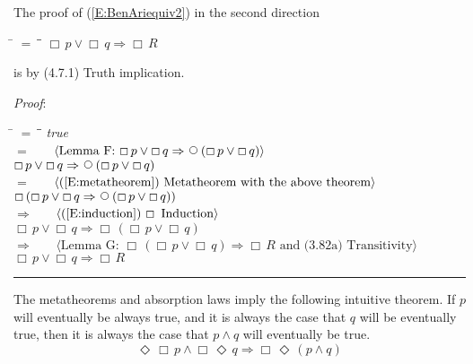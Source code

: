 \documentclass[12pt, fleqn, leqno]{article}
\newcommand{\lgap}{2pt}                             %
\newcommand{\mymathindent}{24pt}                    %
\newcommand{\impl}{\ensuremath{\Rightarrow}}        %
\newcommand{\Next}{\;\,\text{\raisebox{3.5pt}{\circle{6}}}}
\newcommand{\Event}{\Diamond\,}
\newcommand{\Always}{\Box\,}
\newcommand{\myqed}{\rule[-.23ex]{1.2ex}{2.0ex}}
\newcommand{\myqedtab}{\hspace{384pt}}              %
\newcommand{\Gll} {\langle}                         %
\newcommand{\Ggg} {\rangle}                         %
\newcommand{\Hint}[1]     {\ \ \ $\Gll              \mbox{#1} \Ggg$ }   %
\begin{document}
{The proof of (\ref{E:BenAriequiv2}) in the second direction
\begin{tabbing}
\hspace{\mymathindent} \= $= \;$ \= \myqedtab \= \kill
  \> $\Always p \lor \Always q \impl \Always R$
\end{tabbing}
is by (4.7.1) Truth implication.

\emph{Proof}:
\begin{tabbing}
\hspace{\mymathindent} \= $= \;$ \= \myqedtab \= \kill
  \> \>   \textit{true}\\[\lgap]
  \> $=$  \>  \Hint{Lemma F: $\Always p \lor \Always q \impl \Next (\Always p \lor \Always q)$}\\[\lgap]
  \> \>   $\Always p \lor \Always q \impl \Next (\Always p \lor \Always q)$\\[\lgap]
  \> $=$  \>  \Hint{(\ref{E:metatheorem}) Metatheorem with the above theorem}\\[\lgap]
  \> \>   $\Always (\Always p \lor \Always q \impl \Next (\Always p \lor \Always q))$\\[\lgap]
  \> $\impl$  \>  \Hint{(\ref{E:induction}) $\Always$ Induction}\\[\lgap]
  \> \>   $\Always p \lor \Always q \impl \Always (\Always p \lor \Always q)$\\[\lgap]
  \> $\impl$  \>  \Hint{Lemma G: $\Always (\Always p \lor \Always q) \impl \Always R$ and (3.82a) Transitivity}\\[\lgap]
  \> \>   $\Always p \lor \Always q \impl \Always R$ \quad \myqed
\end{tabbing}
}

The metatheorems and absorption laws imply the following intuitive theorem.
If $p$ will eventually be always true, and it is always the case that $q$ will be eventually true, then it is always the case that $p\land q$ will eventually be true.
\begin{equation}\label{E:eventAlwaysPAndAlwaysEventQ}
\Event\Always p\land \Always\Event q \impl \Always\Event (p\land q)
\end{equation}
\end{document}
